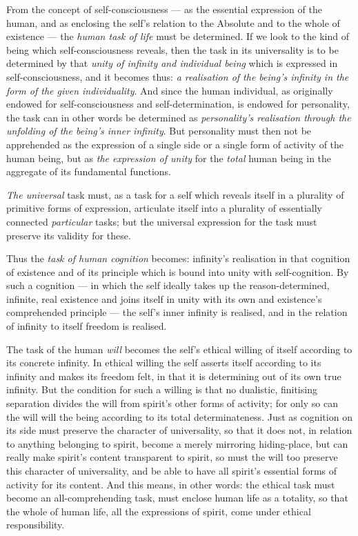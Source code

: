 \documentclass[12pt,a4paper]{book}
\begin{document}
From the concept of self-consciousness --- as the essential expression of the
human, and as enclosing the self's relation to the Absolute and to the whole
of existence --- the \emph{human task of life} must be determined. If we look
to the kind of being which self-consciousness reveals, then the task in its
universality is to be determined by that \emph{unity of infinity and
individual being} which is expressed in self-consciousness, and it becomes
thus: \emph{a realisation of the being's infinity in the form of the given
individuality}. And since the human individual, as originally endowed for
self-consciousness and self-determination, is endowed for personality, the
task can in other words be determined as \emph{personality's realisation
through the unfolding of the being's inner infinity}. But personality must
then not be apprehended as the expression of a single side or a single form of
activity of the human being, but as \emph{the expression of unity} for the
\emph{total} human being in the aggregate of its fundamental functions.

\emph{The universal} task must, as a task for a self which reveals itself in a
plurality of primitive forms of expression, articulate itself into a plurality
of essentially connected \emph{particular} tasks; but the universal expression
for the task must preserve its validity for these.

Thus the \emph{task of human cognition} becomes: infinity's realisation in
that cognition of existence and of its principle which is bound into unity
with self-cognition. By such a cognition --- in which the self ideally takes
up the reason-determined, infinite, real existence and joins itself in unity
with its own and existence's comprehended principle --- the self's inner
infinity is realised, and in the relation of infinity to itself freedom is
realised.

The task of the human \emph{will} becomes the self's ethical willing of itself
according to its concrete infinity. In ethical willing the self asserts itself
according to its infinity and makes its freedom felt, in that it is
determining out of its own true infinity. But the condition for such a willing
is that no dualistic, finitising separation divides the will from spirit's
other forms of activity; for only so can the will will the being according to
its total determinateness. Just as cognition on its side must preserve the
character of universality, so that it does not, in relation to anything
belonging to spirit, become a merely mirroring hiding-place, but can really
make spirit's content transparent to spirit, so must the will too preserve this
character of universality, and be able to have all spirit's essential forms of
activity for its content. And this means, in other words: the ethical task
must become an all-comprehending task, must enclose human life as a totality,
so that the whole of human life, all the expressions of spirit, come under
ethical responsibility.
\end{document}

